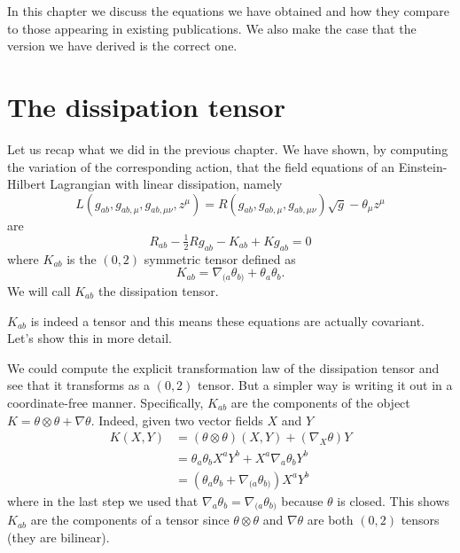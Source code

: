 \documentclass[../main.tex]{subfiles}
\begin{document}
In this chapter we discuss the equations we have obtained and how they compare to those
appearing in existing publications. We also make the case that the version we have derived
is the correct one. 

\section{The dissipation tensor}
Let us recap what we did in the previous chapter. We have shown, by computing the
variation of the corresponding action, that the field equations of an Einstein-Hilbert
Lagrangian with linear dissipation, namely
\begin{equation} 
	L(g_{ab}, g_{ab,\mu}, g_{ab,\mu\nu}, z^\mu) = R(g_{ab}, g_{ab,\mu}, g_{ab,\mu\nu})
	\sqrt{g} - \theta_\mu z^\mu
\end{equation}
are
\begin{equation} 
	R_{ab} - \tfrac{1}{2}Rg_{ab} - K_{ab} + Kg_{ab} = 0
\end{equation}
where \( K_{ab} \) is the \( (0,2) \) symmetric tensor defined as
\begin{equation}
	K_{ab} = \nabla_{(a}\theta_{b)} + \theta_a\theta_b. 
\end{equation}
We will call \( K_{ab} \) the dissipation tensor. 

\( K_{ab} \) is indeed a tensor and this means these equations are actually covariant.
Let's show this in more detail. 

We could compute the explicit transformation law of the dissipation tensor and see that it
transforms as a \( (0,2) \) tensor. But a simpler way is writing it out in a
coordinate-free manner.  Specifically, \( K_{ab} \) are the components of the object \( K
= \theta \otimes \theta + \nabla \theta \). Indeed, given two vector fields \( X \) and \(
Y \)
\begin{align*} 
	K(X,Y) & = (\theta \otimes \theta)(X,Y) + (\nabla_X \theta)Y \\
				 & = \theta_a \theta_b X^a Y^b + X^a \nabla_a \theta_b Y^b \\
				 & = (\theta_a \theta_b + \nabla_{(a}\theta_{b)})X^a Y^b
\end{align*}
where in the last step we used that \( \nabla_{a}\theta_b = \nabla_{(a}\theta_{b)} \)
because \( \theta \) is closed. This shows \( K_{ab} \) are the components of a tensor
since \( \theta \otimes \theta \) and \( \nabla \theta \) are both \( (0,2) \) tensors
(they are bilinear). 
\end{document}
